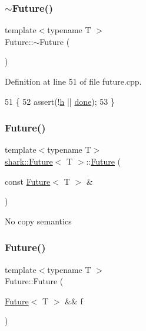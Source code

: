 \subsubsection{\texorpdfstring{$\sim$\+Future()}{~Future()}}
{\footnotesize\ttfamily template$<$typename T $>$ \\
Future\+::$\sim$\+Future (\begin{DoxyParamCaption}{ }\end{DoxyParamCaption})}



Definition at line 51 of file future.\+cpp.


\begin{DoxyCode}
51                    \{
52     assert(!\hyperlink{structshark_1_1_future_a54f00db085adbffb18b2e2ab9e3d4b32}{h} || \hyperlink{structshark_1_1_future_ae873cf93e919c066f04ff337ce3a21e1}{done});
53 \}
\end{DoxyCode}
\hypertarget{structshark_1_1_future_a3c76fd022444f58fcc06ee248d81f72b}{}\label{structshark_1_1_future_a3c76fd022444f58fcc06ee248d81f72b} 
\subsubsection{\texorpdfstring{Future()}{Future()}\hspace{0.1cm}{\footnotesize\ttfamily [4/5]}}
{\footnotesize\ttfamily template$<$typename T$>$ \\
\hyperlink{structshark_1_1_future}{shark\+::\+Future}$<$ T $>$\+::\hyperlink{structshark_1_1_future}{Future} (\begin{DoxyParamCaption}\item[{const \hyperlink{structshark_1_1_future}{Future}$<$ T $>$ \&}]{ }\end{DoxyParamCaption})\hspace{0.3cm}{\ttfamily [delete]}}

No copy semantics \hypertarget{structshark_1_1_future_a6eff07d7db700729f333f86712dd5f07}{}\label{structshark_1_1_future_a6eff07d7db700729f333f86712dd5f07} 
\subsubsection{\texorpdfstring{Future()}{Future()}\hspace{0.1cm}{\footnotesize\ttfamily [5/5]}}
{\footnotesize\ttfamily template$<$typename T $>$ \\
Future\+::\+Future (\begin{DoxyParamCaption}\item[{\hyperlink{structshark_1_1_future}{Future}$<$ T $>$ \&\&}]{f }\end{DoxyParamCaption})}

